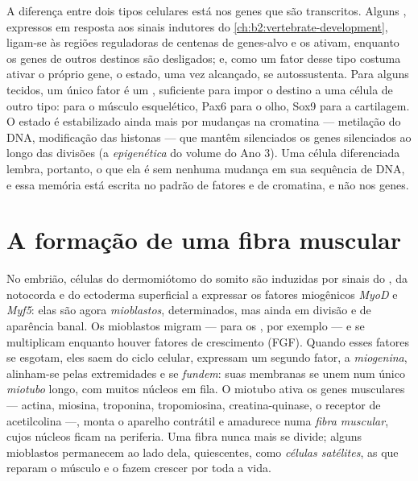 \begin{proposition}\label{prop:b2:cell-differentiation:transcriptional}
A diferença entre dois tipos celulares está nos genes que são
transcritos. Alguns \emph{}, expressos em
resposta aos sinais indutores do \cref{ch:b2:vertebrate-development}, ligam-se às regiões
reguladoras de centenas de genes-alvo e os ativam, enquanto os genes
de outros destinos são desligados; e, como um fator desse tipo
costuma ativar o próprio gene, o estado, uma vez alcançado, se
autossustenta. Para alguns tecidos, um único fator é um
\emph{}, suficiente para impor o destino a uma célula
de outro tipo:  para o músculo esquelético, Pax6 para o olho, Sox9
para a cartilagem. O estado é estabilizado ainda mais por mudanças na
cromatina --- metilação do DNA, modificação das histonas --- que mantêm
silenciados os genes silenciados ao longo das divisões (a
\emph{epigenética} do volume do Ano 3). Uma célula diferenciada
lembra, portanto, o que ela é sem nenhuma mudança em sua sequência de
DNA, e essa memória está escrita no padrão de fatores e de cromatina,
e não nos genes.
\end{proposition}

\section{A formação de uma fibra muscular}

\begin{definition}[Miogênese]\label{def:b2:cell-differentiation:myogenesis}
No embrião, células do dermomiótomo do somito são induzidas por sinais
do , da notocorda e do ectoderma superficial a expressar os
fatores miogênicos \emph{MyoD} e \emph{Myf5}: elas são agora
\emph{mioblastos}, determinados, mas ainda em divisão e de aparência
banal. Os mioblastos migram --- para os , por exemplo
--- e se multiplicam enquanto houver fatores de crescimento (FGF).
Quando esses fatores se esgotam, eles saem do ciclo celular, expressam
um segundo fator, a \emph{miogenina}, alinham-se pelas extremidades e
se \emph{fundem}: suas membranas se unem num único \emph{miotubo}
longo, com muitos núcleos em fila. O miotubo ativa os genes musculares
--- actina, miosina, troponina, tropomiosina, creatina-quinase, o
receptor de acetilcolina ---, monta o aparelho contrátil e amadurece
numa \emph{fibra muscular}, cujos núcleos ficam na periferia. Uma fibra
nunca mais se divide; alguns mioblastos permanecem ao lado dela,
quiescentes, como \emph{células satélites}, as  que
reparam o músculo e o fazem crescer por toda a vida.
\end{definition}

